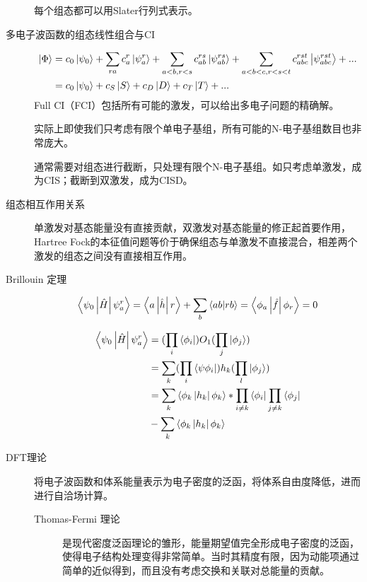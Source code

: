 \documentclass[12pt,a4paper,openany,twoside]{book}
\numberwithin{equation}{section}
\newcommand{\bracketl}[3]{\left\langle #1 \left| #2 \right| #3 \right\rangle}
\begin{document}
\begin{description}
            每个组态都可以用Slater行列式表示。

          \item[多电子波函数的组态线性组合与CI]
            \begin{align*}
              \ket{\Phi} &= c_0\ket{\psi_0} +\sum_{ra}c_a^r\ket{\psi_a^r}+\sum_{a<b,r<s}c_{ab}^{rs}\ket{\psi_{ab}^{rs}}+\sum_{a<b<c,r<s<t}c^{rst}_{abc}\ket{\psi^{rst}_{abc}}+...\\
              &=c_0\ket{\psi_0} + c_S\ket{S}+c_D\ket{D}+c_T\ket{T}+...
            \end{align*}
            Full CI（FCI）包括所有可能的激发，可以给出多电子问题的精确解。

            实际上即使我们只考虑有限个单电子基组，所有可能的N-电子基组数目也非常庞大。

            通常需要对组态进行截断，只处理有限个N-电子基组。如只考虑单激发，成为CIS；截断到双激发，成为CISD。
        
          \item[组态相互作用关系] 单激发对基态能量没有直接贡献，双激发对基态能量的修正起首要作用，Hartree Fock的本征值问题等价于确保组态与单激发不直接混合，相差两个激发的组态之间没有直接相互作用。
        
          \item[Brillouin 定理]
            \begin{equation}
              \bracketl{\psi_0}{\hat{H}}{\psi_a^r}=\bracketl{a}{\hat{h}}{r}+\sum_b\bra{ab}\ket{rb}=\bracketl{\phi_a}{\hat{f}}{\phi_r}=0
            \end{equation}
          
            \begin{align*}
              \bracketl{\psi_0}{\hat{H}}{\psi_a^r}&=(\prod_i\bra{\phi_i})O_1(\prod_j\ket{\phi_j})\\
              &=\sum_k(\prod_i\bra{\psi{\phi_i}})h_k(\prod_l\ket{\phi_j})\\
              &=\sum_k \bracketl{\phi_k}{h_k}{\phi_k}*\prod_{i \neq k} \bra{\phi_i} \prod_{j \neq k} \bra{\phi_j}\\
              &-\sum_k \bracketl{\phi_k}{h_k}{\phi_k}
            \end{align*}

          \item[DFT理论]将电子波函数和体系能量表示为电子密度的泛函，将体系自由度降低，进而进行自洽场计算。
            \begin{description}
              \item[Thomas-Fermi 理论]
                是现代密度泛函理论的雏形，能量期望值完全形成电子密度的泛函，使得电子结构处理变得非常简单。当时其精度有限，因为动能项通过简单的近似得到，而且没有考虑交换和关联对总能量的贡献。


\end{description}
\end{description}
\end{document}
